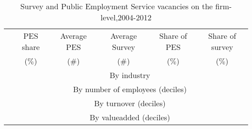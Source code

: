       \begin{table}[htbp]\centering
      \caption{\label{tab:PES_survey} Survey and Public Employment Service vacancies on the firm-level,2004-2012 }
			\begin{tabularx} {\textwidth} { l c  c  c c c} \\ \hline %
      
			\textbf{ } & \scriptsize{PES share}  & \scriptsize{Average PES}  &  \scriptsize{Average Survey} &  \scriptsize{Share of PES} &  \scriptsize{Share of survey }  \\
			
			      \textbf{ } & \scriptsize{($\%$)}  & \scriptsize{($\#$)}  &  \scriptsize{($\#$)} &  \scriptsize{($\%$)} &  \scriptsize{($\%$)}  \\
			
      \midrule
			   & \multicolumn{5}{c}{By industry} \\
			\midrule

     \midrule
						   & \multicolumn{5}{c}{By number of employees (deciles)} \\
			\midrule

     \midrule
						   & \multicolumn{5}{c}{By turnover (deciles)} \\
			\midrule

     \midrule
								   & \multicolumn{5}{c}{By valueadded (deciles)} \\
			\midrule

     \midrule
				\hline
      \end{tabularx}
      \end{table}


